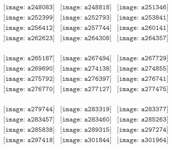 \documentclass{article}
\begin{document}
\begin{figure}[H]
 \begin{center}$
 \begin{array}{cccc}
\texttt{[image: a248083]}&\texttt{[image: a248818]}&\texttt{[image: a251346]}\\\texttt{[image: a252399]}&\texttt{[image: a252793]}&\texttt{[image: a253841]}\\\texttt{[image: a256412]}&\texttt{[image: a257744]}&\texttt{[image: a260141]}\\\texttt{[image: a262623]}&\texttt{[image: a264308]}&\texttt{[image: a264357]}\\
\end{array}$
\end{center}
\end{figure}

\begin{figure}[H]
 \begin{center}$
 \begin{array}{cccc}
\texttt{[image: a265187]}&\texttt{[image: a267494]}&\texttt{[image: a267729]}\\\texttt{[image: a269690]}&\texttt{[image: a274138]}&\texttt{[image: a274855]}\\\texttt{[image: a275792]}&\texttt{[image: a276397]}&\texttt{[image: a276741]}\\\texttt{[image: a276770]}&\texttt{[image: a277127]}&\texttt{[image: a277475]}\\
\end{array}$
\end{center}
\end{figure}

\begin{figure}[H]
 \begin{center}$
 \begin{array}{cccc}
\texttt{[image: a279744]}&\texttt{[image: a283319]}&\texttt{[image: a283377]}\\\texttt{[image: a283457]}&\texttt{[image: a283460]}&\texttt{[image: a285263]}\\\texttt{[image: a285838]}&\texttt{[image: a289315]}&\texttt{[image: a297274]}\\\texttt{[image: a297418]}&\texttt{[image: a301844]}&\texttt{[image: a301964]}\\
\end{array}$
\end{center}
\end{figure}
\end{document}
